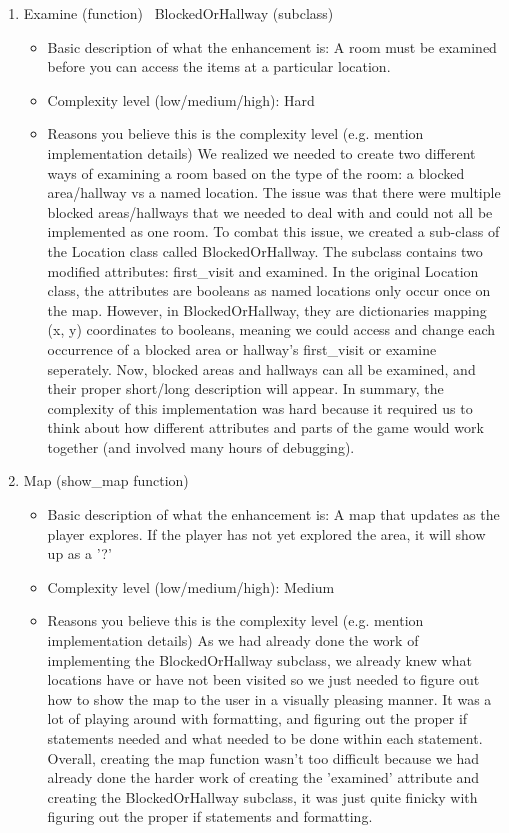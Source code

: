 \documentclass[11pt]{article}
\begin{document}
\begin{enumerate}
\item Examine (function) \ BlockedOrHallway (subclass)
	\begin{itemize}
	\item Basic description of what the enhancement is: A room must be examined before you can access the items at a
	particular location.
	\item Complexity level (low/medium/high): Hard
	\item Reasons you believe this is the complexity level (e.g. mention implementation details)
	We realized we needed to create two different ways of examining a room based on the type of the room:
	a blocked area/hallway vs a named location. The issue was that there were multiple blocked areas/hallways that we
	needed to deal with and could not all be implemented as one room. To combat this issue, we created a sub-class of
	the Location class called BlockedOrHallway. The subclass contains two modified attributes: first_visit and examined.
	In the original Location class, the attributes are booleans as named locations only occur once on the map. However,
	in BlockedOrHallway, they are dictionaries mapping (x, y) coordinates to booleans, meaning we could access and
	change each occurrence of a blocked area or hallway's first_visit or examine seperately. Now, blocked areas and
	hallways can all be examined, and their proper short/long description will appear. In summary, the complexity of
	this implementation was hard because it required us to think about how different attributes and parts of the game
	would work together (and involved many hours of debugging).
	\end{itemize}



\item Map (show_map function)
	\begin{itemize}
	\item Basic description of what the enhancement is: A map that updates as the player explores.
	If the player has not yet explored the area, it will show up as a '?'
	\item Complexity level (low/medium/high): Medium
	\item Reasons you believe this is the complexity level (e.g. mention implementation details)
	As we had already done the work of implementing the BlockedOrHallway subclass, we already knew what locations have
	or have not been visited so we just needed to figure out how to show the map to the user in a visually pleasing
	manner. It was a lot of playing around with formatting, and figuring out the proper if statements needed and what
	needed to be done within each statement. Overall, creating the map function wasn't too difficult because we had
	already done the harder work of creating the 'examined' attribute and creating the BlockedOrHallway subclass, it
	was just quite finicky with figuring out the proper if statements and formatting.
	\end{itemize}




\end{enumerate}
\end{document}
